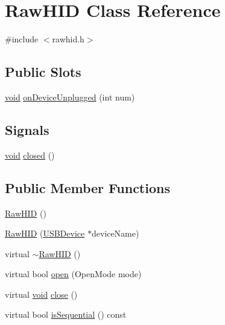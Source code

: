 \hypertarget{class_raw_h_i_d}{\section{\-Raw\-H\-I\-D \-Class \-Reference}
\label{class_raw_h_i_d}
}


{\ttfamily \#include $<$rawhid.\-h$>$}

\subsection*{\-Public \-Slots}
\begin{DoxyCompactItemize}
\item 
\hyperlink{group___u_a_v_objects_plugin_ga444cf2ff3f0ecbe028adce838d373f5c}{void} \hyperlink{group___raw_h_i_d_plugin_ga62bfd16ef26f8f8e8c52ce836b268c71}{on\-Device\-Unplugged} (int num)
\end{DoxyCompactItemize}
\subsection*{\-Signals}
\begin{DoxyCompactItemize}
\item 
\hyperlink{group___u_a_v_objects_plugin_ga444cf2ff3f0ecbe028adce838d373f5c}{void} \hyperlink{group___raw_h_i_d_plugin_ga4ababcef71544d260177e4957426598c}{closed} ()
\end{DoxyCompactItemize}
\subsection*{\-Public \-Member \-Functions}
\begin{DoxyCompactItemize}
\item 
\hyperlink{group___raw_h_i_d_plugin_gab8670136473a97cded80dd1a4e785680}{\-Raw\-H\-I\-D} ()
\item 
\hyperlink{group___raw_h_i_d_plugin_gae7f570657448daa4890a0e38f693e6ed}{\-Raw\-H\-I\-D} (\hyperlink{class_u_s_b_device}{\-U\-S\-B\-Device} $\ast$device\-Name)
\item 
virtual \hyperlink{group___raw_h_i_d_plugin_gaa925a3d3cbb80dd61705cedd4a0d5167}{$\sim$\-Raw\-H\-I\-D} ()
\item 
virtual bool \hyperlink{group___raw_h_i_d_plugin_ga58a13b23858ae0b323802154fa2b93a8}{open} (\-Open\-Mode mode)
\item 
virtual \hyperlink{group___u_a_v_objects_plugin_ga444cf2ff3f0ecbe028adce838d373f5c}{void} \hyperlink{group___raw_h_i_d_plugin_gad109f6050214525dde9804f5a20bf53f}{close} ()
\item 
virtual bool \hyperlink{group___raw_h_i_d_plugin_gaf9b8ab547528829a7ef19c1d9a9e692a}{is\-Sequential} () const 
\end{DoxyCompactItemize}
